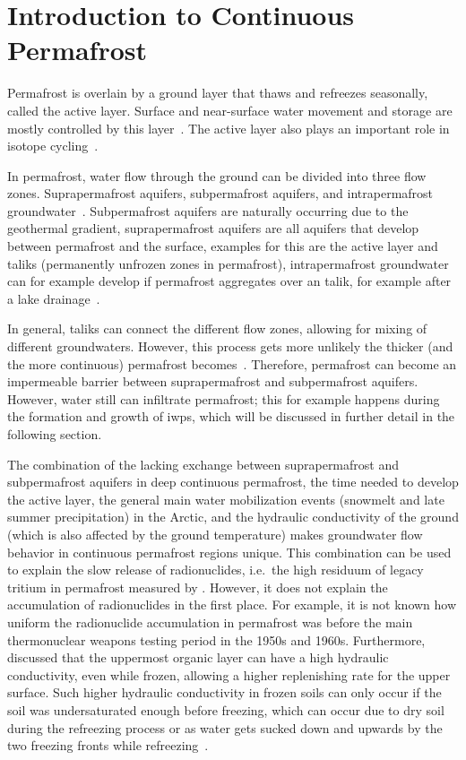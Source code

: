 \chapter{Introduction to Continuous Permafrost}
Permafrost is overlain by a ground layer that thaws and refreezes seasonally, called the active layer. 
Surface and near-surface water movement and storage are mostly controlled by this layer~\citep{walvoordHydrologicImpactsThawing2016}. 
The active layer also plays an important role in isotope cycling~\citep{tetzlaffTracerbasedAssessmentFlow2015}.

In permafrost, water flow through the ground can be divided into three flow zones. 
Suprapermafrost aquifers, subpermafrost aquifers, and intrapermafrost groundwater~\citep{walvoordHydrologicImpactsThawing2016,wooPermafrostHydrology2012}. 
Subpermafrost aquifers are naturally occurring due to the geothermal gradient, suprapermafrost aquifers are all aquifers that develop between permafrost and the surface, examples for this are the active layer and taliks (permanently unfrozen zones in permafrost), intrapermafrost groundwater can for example develop if permafrost aggregates over an talik, for example after a lake drainage~\citep{walvoordHydrologicImpactsThawing2016,wooPermafrostHydrology2012}.

In general, taliks can connect the different flow zones, allowing for mixing of different groundwaters. However, this process gets more unlikely the thicker (and the more continuous) permafrost becomes~\citep{wooPermafrostHydrology2012}. Therefore, permafrost can become an impermeable barrier between suprapermafrost and subpermafrost aquifers. However, water still can infiltrate permafrost; this for example happens during the formation and growth of \glspl{iwp}, which will be discussed in further detail in the following section.

The combination of the lacking exchange between suprapermafrost and subpermafrost aquifers in deep continuous permafrost, the time needed to develop the active layer, the general main water mobilization events (snowmelt and late summer precipitation) in the Arctic, and the hydraulic conductivity of the ground (which is also affected by the ground temperature) makes groundwater flow behavior in continuous permafrost regions unique. 
This combination can be used to explain the slow release of radionuclides, i.e.\ the high residuum of legacy tritium in permafrost measured by \citet{bondPermafrostThawImplications2018}. However, it does not explain the accumulation of radionuclides in the first place. For example, it is not known how uniform the radionuclide accumulation in permafrost was before the main thermonuclear weapons testing period in the 1950s and 1960s. 
Furthermore, \citet{quintonSubsurfaceDrainageHummockcovered2000} discussed that the uppermost organic layer can have a high hydraulic conductivity, even while frozen, allowing a higher replenishing rate for the upper surface. 
Such higher hydraulic conductivity in frozen soils can only occur if the soil was undersaturated enough before freezing, which can occur due to dry soil during the refreezing process or as water gets sucked down and upwards by the two freezing fronts while refreezing~\citep{mackayOriginHummocksWestern1980}.

